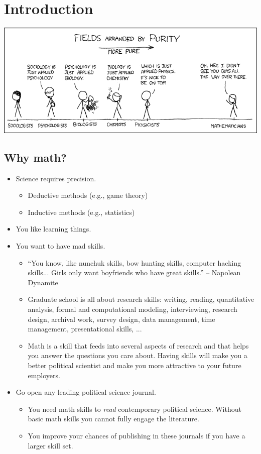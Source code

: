 \documentclass[12pt]{extarticle}
\newcommand{\bi}{\begin{itemize}}
\newcommand{\ei}{\end{itemize}}
\begin{document}
\section{Introduction}
\begin{center}
\includegraphics[width=6in]{purity}
\end{center}
\subsection{Why math?}
\bi
\item Science requires precision.
\bi
\item Deductive methods (e.g., game theory)
\item Inductive methods (e.g., statistics)
\ei
\item You like learning things.
\item You want to have mad skills.
\bi
\item  ``You know, like nunchuk skills, bow hunting skills, computer
  hacking skills... Girls only want boyfriends who have great
  skills.''  -- Napolean Dynamite
\item Graduate school is all about research skills: writing, reading, quantitative analysis, formal and computational modeling, interviewing, research design, archival work, survey design, data management, time management, presentational skills, ...
\item Math is a skill that feeds into several aspects of research and that helps you answer the
  questions you care about.  Having skills will make you a better
  political scientist and make you more attractive to your future
  employers.  
\ei
\item Go open any leading political science journal.
\bi
\item You need math skills to \textit{read} contemporary political
  science.  Without basic math skills you cannot fully engage the
  literature.  
\item You improve your chances of publishing in these journals if you
  have a larger skill set.
\ei
\ei
\end{document}
